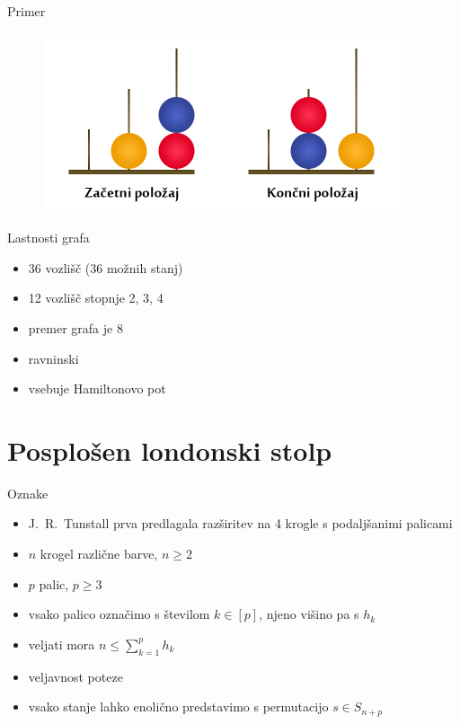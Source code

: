 \documentclass{beamer}
\begin{document}
\begin{frame}{Primer}
    \begin{figure}
        \centering
        \includegraphics[height=150pt]{img/london-tower.png}
    \end{figure}
\end{frame}

\begin{frame}{Lastnosti grafa}
    \begin{itemize}
        \item 36 vozlišč (36 možnih stanj)
        \item 12 vozlišč stopnje 2, 3, 4
        \item premer grafa je 8
        \item ravninski
        \item vsebuje Hamiltonovo pot
    \end{itemize}
\end{frame}

\section{Posplošen londonski stolp}
\begin{frame}{Oznake}
    \begin{itemize}
        \item J.\ R.\ Tunstall prva predlagala razširitev na 4 krogle s podaljšanimi palicami
        \item $n$ krogel različne barve, $n \geq 2$
        \item $p$ palic, $p \geq 3$
        \item vsako palico označimo s številom $k \in [p]$, njeno višino pa s $h_k$
        \item veljati mora $n \leq \sum_{k=1}^p h_k$
        \item veljavnost poteze
        \item vsako stanje lahko enolično predstavimo s permutacijo $s \in S_{n+p}$
    \end{itemize}
\end{frame}
\end{document}
